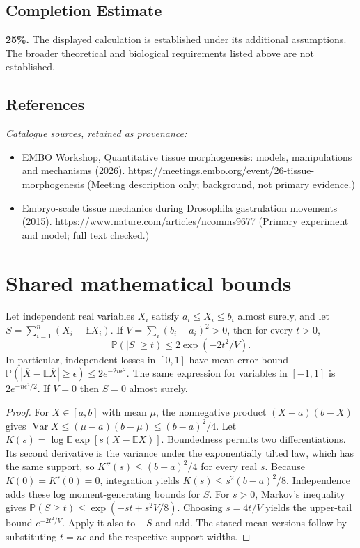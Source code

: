 \documentclass[11pt]{article}
\begin{document}
\subsection{Completion Estimate}
\textbf{25\%.} The displayed calculation is established under its additional assumptions. The broader theoretical and biological requirements listed above are not established.
\subsection{References}
\noindent\emph{Catalogue sources, retained as provenance:}
\begin{itemize}
\item EMBO Workshop, Quantitative tissue morphogenesis: models, manipulations and mechanisms (2026). \url{https://meetings.embo.org/event/26-tissue-morphogenesis} (Meeting description only; background, not primary evidence.)
\item Embryo-scale tissue mechanics during Drosophila gastrulation movements (2015). \url{https://www.nature.com/articles/ncomms9677} (Primary experiment and model; full text checked.)
\end{itemize}




\section{Shared mathematical bounds}\label{app:bounds}
\begin{lemma}\label{lem:bounded}
Let independent real variables $X_i$ satisfy $a_i\leq X_i\leq b_i$ almost surely,
and let $S=\sum_{i=1}^n(X_i-\mathbb{E} X_i)$. If
$V=\sum_i(b_i-a_i)^2>0$, then for every $t>0$,
\[
 \mathbb{P}(|S|\geq t)\leq 2\exp(-2t^2/V).
\]
In particular, independent losses in $[0,1]$ have mean-error bound
$\mathbb{P}(|\overline X-\mathbb{E}\overline X|\geq\epsilon)
\leq2e^{-2n\epsilon^2}$. The same expression for variables in $[-1,1]$
is $2e^{-n\epsilon^2/2}$. If $V=0$ then $S=0$ almost surely.
\end{lemma}
\begin{proof}
For $X\in[a,b]$ with mean $\mu$, the nonnegative product
$(X-a)(b-X)$ gives
$\operatorname{Var} X\leq(\mu-a)(b-\mu)\leq(b-a)^2/4$.
Let $K(s)=\log\mathbb{E}\exp[s(X-\mathbb{E} X)]$.
Boundedness permits two differentiations. Its second derivative is the variance
under the exponentially tilted law, which has the same support, so
$K''(s)\leq(b-a)^2/4$ for every real $s$.
Because $K(0)=K'(0)=0$, integration yields
$K(s)\leq s^2(b-a)^2/8$.
Independence adds these log moment-generating bounds for $S$.
For $s>0$, Markov's inequality gives
$\mathbb{P}(S\geq t)\leq\exp(-st+s^2V/8)$.
Choosing $s=4t/V$ yields the upper-tail bound $e^{-2t^2/V}$.
Apply it also to $-S$ and add. The stated mean versions follow by substituting
$t=n\epsilon$ and the respective support widths.
\end{proof}
\end{document}

